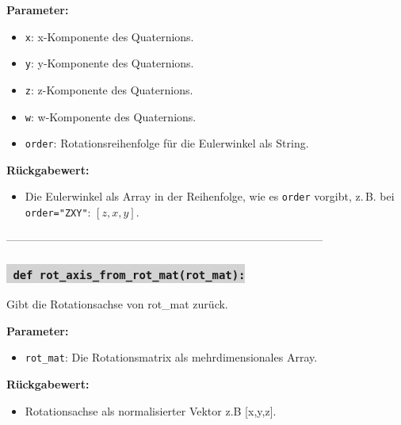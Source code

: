 \noindent \textbf{Parameter:} \vspace{-6ex} \\
\begin{itemize}
    \setlength{\itemindent}{1em}
    \item \texttt{x}: x-Komponente des Quaternions.
    \item \texttt{y}: y-Komponente des Quaternions.
    \item \texttt{z}: z-Komponente des Quaternions.
    \item \texttt{w}: w-Komponente des Quaternions.
    \item \texttt{order}: Rotationsreihenfolge für die Eulerwinkel als String.
\end{itemize}

\noindent \textbf{Rückgabewert:} \vspace{-6ex} \\
\begin{itemize}
    \setlength{\itemindent}{1em}
    \item Die Eulerwinkel als Array in der Reihenfolge, wie es \texttt{order} vorgibt, z.\,B. bei \texttt{order="ZXY"}: $[z, x, y]$.
\end{itemize}

--------------------------------------------------------------------------------------


\subsubsection*{\colorbox{lightgray}{\texttt{\textbf{\color{green} def} \color{blue} rot\_axis\_from\_rot\_mat}\textbf{\texttt{(rot\_mat):}}}}
Gibt die Rotationsachse von rot\_mat zurück.

\noindent \textbf{Parameter:} \vspace{-6ex} \\
\begin{itemize}
    \setlength{\itemindent}{1em}  %
    \item \texttt{rot\_mat}: Die Rotationsmatrix als mehrdimensionales Array.
\end{itemize}

\noindent \textbf{Rückgabewert:} \vspace{-6ex} \\
\begin{itemize}
    \setlength{\itemindent}{1em}  %
    \item Rotationsachse als normalisierter Vektor z.B [x,y,z].
\end{itemize}

